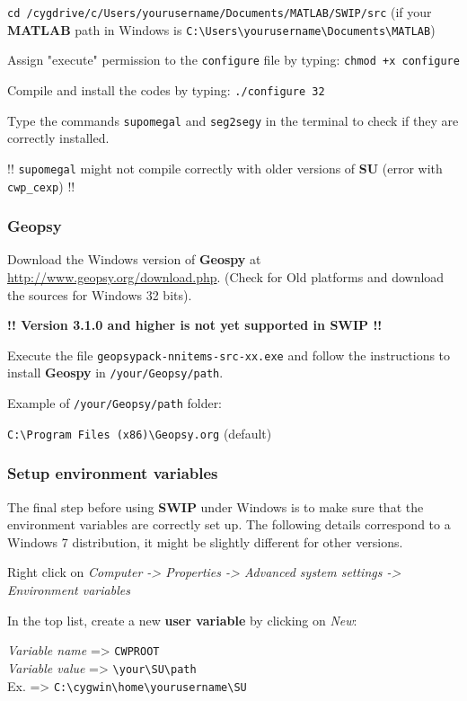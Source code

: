 \documentclass[twoside,a4paper]{article}
\def\SWIP{\textbf{SWIP}}
\def\SU{\textbf{SU}}
\def\Geopsy{\textbf{Geospy}}
\def\MATLAB{\textbf{MATLAB}}
\begin{document}
\verb|cd /cygdrive/c/Users/yourusername/Documents/MATLAB/SWIP/src| (if your {\MATLAB} path in Windows is \verb|C:\Users\yourusername\Documents\MATLAB|)

Assign "execute" permission to the \verb|configure| file by typing: \verb|chmod +x configure|

Compile and install the codes by typing: \verb|./configure 32|

Type the commands \verb|supomegal| and \verb|seg2segy| in the terminal to check if they are correctly installed.

!! \verb|supomegal| might not compile correctly with older versions of {\SU} (error with \verb|cwp_cexp|) !!

\subsubsection{Geopsy}
Download the Windows version of {\Geopsy} at \url{http://www.geopsy.org/download.php}.
(Check for Old platforms and download the sources for Windows 32 bits).

\textbf{!! Version 3.1.0 and higher is not yet supported in SWIP !!}

Execute the file \verb|geopsypack-nnitems-src-xx.exe| and follow the instructions to install {\Geopsy} in \verb|/your/Geopsy/path|.

Example of \verb|/your/Geopsy/path| folder:

\verb|C:\Program Files (x86)\Geopsy.org| (default)

\subsubsection{Setup environment variables}
The final step before using {\SWIP} under Windows is to make sure that the environment variables are correctly set up. The following details correspond to a Windows 7 distribution, it might be slightly different for other versions.

Right click on \textit{Computer -> Properties -> Advanced system settings -> Environment variables}

In the top list, create a new \textbf{user variable} by clicking on \textit{New}:

\textit{Variable name} => \verb|CWPROOT|\\
\textit{Variable value} => \verb|\your\SU\path|\\
Ex. => \verb|C:\cygwin\home\yourusername\SU|
\end{document}
